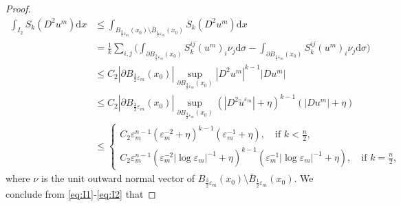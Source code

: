 \documentclass[reqno]{amsart}
\theoremstyle{remark}
\theoremstyle{definition}
\numberwithin{equation}{section}
\begin{document}
\begin{proof}
\begin{equation}\label{eq:I2}
\begin{split}
    \int_{I_2} S_k(D^2u^m) \mathrm{d}x &\leq \int_{B_{\frac{3}{2}\varepsilon_m}(x_0) \setminus \bar{B}_{\frac{1}{2}\varepsilon_m}(x_0)}S_k(D^2u^m)  \mathrm{d}x \\
    &= \frac{1}{k}\sum_{i,j}\bigg(\int_{\partial B_{\frac{3}{2}\varepsilon_m}(x_0)} S_k^{ij} (u^m)_i \nu_j \mathrm{d}\sigma - \int_{\partial B_{\frac{1}{2}\varepsilon_m}(x_0)} S_k^{ij} (u^m)_i \nu_j \mathrm{d}\sigma\bigg) \\
    &\leq C_2|\partial B_{\frac{3}{2}\varepsilon_m}(x_0)|\sup_{\partial B_{\frac{3}{2}\varepsilon_m}(x_0)}|D^2u^m|^{k-1}|Du^m|\\
    &\leq C_2|\partial B_{\frac{3}{2}\varepsilon_m}(x_0)|\sup_{\partial B_{\frac{3}{2}\varepsilon_m}(x_0)}(|D^2\tilde{u}^{\varepsilon_m}|+\eta)^{k-1}(|Du^m|+\eta)\\
    &\leq 
    \begin{cases}
    C_2 \varepsilon_m^{n-1}(\varepsilon_m^{-2}+\eta)^{k-1}(\varepsilon_m^{-1}+\eta),\quad\text{if }k<\frac{n}{2}, \\[1.5ex]
    C_2 \varepsilon_m^{n-1}(\varepsilon_m^{-2}|\log\varepsilon_m|^{-1}+\eta)^{k-1}(\varepsilon_m^{-1}|\log\varepsilon_m|^{-1}+\eta), \quad\text{if }k=\frac{n}{2},
    \end{cases}
\end{split}
\end{equation}
where $\nu$ is the unit outward normal vector of $B_{\frac{3}{2}\varepsilon_m}(x_0) \setminus \bar{B}_{\frac{1}{2}\varepsilon_m}(x_0)$. We conclude from \eqref{eq:I1}-\eqref{eq:I2} that

\end{proof}
\end{document}
